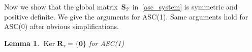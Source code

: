 \documentclass[12pt]{article}
\newcommand{\vect}[1]{\boldsymbol{\mathbf{#1}}}
\newcommand{\bcell}{T}
\newcommand{\bmesh}{{\vect{\mathcal T}}}
\newcommand{\mmesh}{{\vect{\mathcal \tau}}}
\newcommand{\bfaces}[1][]{{\vect{\mathcal F}_{\text{#1}}}}
\DeclareMathOperator{\Ker}{Ker}
\newtheorem{theorem}{Theorem}[section]
\newtheorem{lemma}[theorem]{Lemma}
\begin{document}
Now we show that the global matrix~$\vect S_\bmesh$ in~\eqref{asc_system} is symmetric and positive definite. We give the arguments for ASC(1). Same arguments hold for ASC(0) after obvious simplifications. \\
%		
\begin{lemma}\label{thm:asc1}
	$\Ker\vect R_\mmesh = \{ {\vect 0} \}$ for ASC(1)
\end{lemma}
\end{document}
